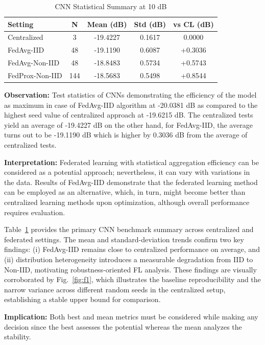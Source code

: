 \documentclass{llncs}
\begin{document}
\begin{table}[htbp]
\caption{CNN Statistical Summary at 10 dB}
\label{tab:cnn_stats}
\centering
\begin{tabular}{lcccc}
\toprule
Setting & N & Mean (dB) & Std (dB) & vs CL (dB) \\
\midrule
Centralized & 3 & -19.4227 & 0.1617 & 0.0000 \\
FedAvg-IID & 48 & -19.1190 & 0.6087 & +0.3036 \\
FedAvg-Non-IID & 48 & -18.8483 & 0.5734 & +0.5743 \\
FedProx-Non-IID & 144 & -18.5683 & 0.5498 & +0.8544 \\
\bottomrule
\end{tabular}
\end{table}

\textbf{Observation:} Test statistics of CNNs demonstrating the efficiency of the model as maximum in case of FedAvg-IID algorithm at -20.0381 dB as compared to the highest seed value of centralized approach at -19.6215 dB. The centralized tests yield an average of -19.4227 dB on the other hand, for FedAvg-IID, the average turns out to be -19.1190 dB which is higher by 0.3036 dB from the average of centralized tests.

\textbf{Interpretation:} Federated learning with statistical aggregation efficiency can be considered as a potential approach; nevertheless, it can vary with variations in the data. Results of FedAvg-IID demonstrate that the federated learning method can be employed as an alternative, which, in turn, might become better than centralized learning methods upon optimization, although overall performance requires evaluation.

Table~\ref{tab:cnn_stats} provides the primary CNN benchmark summary across centralized and federated settings. The mean and standard-deviation trends confirm two key findings: (i) FedAvg-IID remains close to centralized performance on average, and (ii) distribution heterogeneity introduces a measurable degradation from IID to Non-IID, motivating robustness-oriented FL analysis. These findings are visually corroborated by Fig.~\ref{fig:f1}, which illustrates the baseline reproducibility and the narrow variance across different random seeds in the centralized setup, establishing a stable upper bound for comparison.

\textbf{Implication:} Both best and mean metrics must be considered while making any decision since the best assesses
the potential whereas the mean analyzes the stability.
\end{document}
